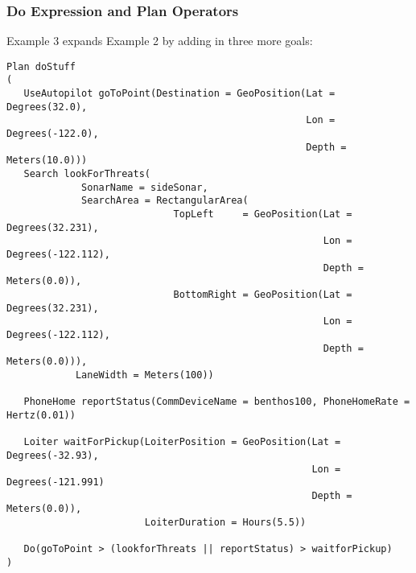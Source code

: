 \subsubsection{Do Expression and Plan Operators}
Example 3 expands Example 2 by adding in three more goals:
\begin{verbatim}
Plan doStuff
(
   UseAutopilot goToPoint(Destination = GeoPosition(Lat = Degrees(32.0),
                                                    Lon = Degrees(-122.0),
                                                    Depth = Meters(10.0)))   
   Search lookForThreats(
             SonarName = sideSonar,
             SearchArea = RectangularArea(
                             TopLeft     = GeoPosition(Lat = Degrees(32.231),
                                                       Lon = Degrees(-122.112),
                                                       Depth = Meters(0.0)),
                             BottomRight = GeoPosition(Lat = Degrees(32.231),
                                                       Lon = Degrees(-122.112),
                                                       Depth = Meters(0.0))),
            LaneWidth = Meters(100))
            
   PhoneHome reportStatus(CommDeviceName = benthos100, PhoneHomeRate = Hertz(0.01))
   
   Loiter waitForPickup(LoiterPosition = GeoPosition(Lat = Degrees(-32.93), 
                                                     Lon = Degrees(-121.991)
                                                     Depth = Meters(0.0)),
                        LoiterDuration = Hours(5.5))                                                        
                                                     
   Do(goToPoint > (lookforThreats || reportStatus) > waitforPickup)                                       
)
\end{verbatim}
\\

